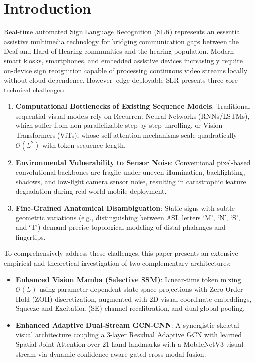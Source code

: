 \documentclass[journal]{IEEEtran}
\begin{document}
\section{Introduction}
Real-time automated Sign Language Recognition (SLR) represents an essential assistive multimedia technology for bridging communication gaps between the Deaf and Hard-of-Hearing communities and the hearing population. Modern smart kiosks, smartphones, and embedded assistive devices increasingly require on-device sign recognition capable of processing continuous video streams locally without cloud dependence. However, edge-deployable SLR presents three core technical challenges:
\begin{enumerate}
    \item \textbf{Computational Bottlenecks of Existing Sequence Models}: Traditional sequential visual models rely on Recurrent Neural Networks (RNNs/LSTMs), which suffer from non-parallelizable step-by-step unrolling, or Vision Transformers (ViTs), whose self-attention mechanisms scale quadratically $\mathcal{O}(L^2)$ with token sequence length.
    \item \textbf{Environmental Vulnerability to Sensor Noise}: Conventional pixel-based convolutional backbones are fragile under uneven illumination, backlighting, shadows, and low-light camera sensor noise, resulting in catastrophic feature degradation during real-world mobile deployment.
    \item \textbf{Fine-Grained Anatomical Disambiguation}: Static signs with subtle geometric variations (e.g., distinguishing between ASL letters `M', `N', `S', and `T') demand precise topological modeling of distal phalanges and fingertips.
\end{enumerate}

To comprehensively address these challenges, this paper presents an extensive empirical and theoretical investigation of two complementary architectures:
\begin{itemize}
    \item \textbf{Enhanced Vision Mamba (Selective SSM)}: Linear-time token mixing $\mathcal{O}(L)$ using parameter-dependent state-space projections with Zero-Order Hold (ZOH) discretization, augmented with 2D visual coordinate embeddings, Squeeze-and-Excitation (SE) channel recalibration, and dual global pooling.
    \item \textbf{Enhanced Adaptive Dual-Stream GCN-CNN}: A synergistic skeletal-visual architecture coupling a 3-layer Residual Adaptive GCN with learned Spatial Joint Attention over 21 hand landmarks with a MobileNetV3 visual stream via dynamic confidence-aware gated cross-modal fusion.
\end{itemize}
\end{document}
